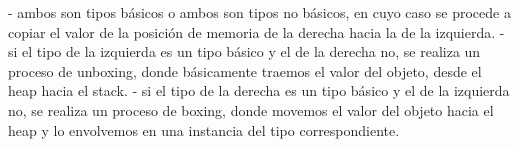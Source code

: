 \documentclass[a4paper,12pt]{article}
\begin{document}
- ambos son tipos básicos o ambos son tipos no básicos, en cuyo caso se procede a copiar el valor de la posición de memoria de la derecha hacia la de la izquierda.
- si el tipo de la izquierda es un tipo básico y el de la derecha no, se realiza un proceso de unboxing, donde básicamente traemos el valor del objeto, desde el heap hacia el stack.
- si el tipo de la derecha es un tipo básico y el de la izquierda no, se realiza un proceso de boxing, donde movemos el valor del objeto hacia el heap y lo envolvemos en una instancia del tipo correspondiente.
\end{document}
